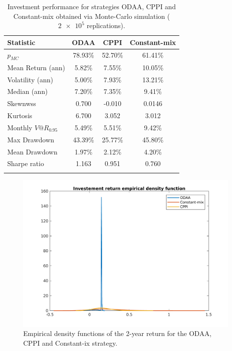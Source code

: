 \begin{table}[]
	\centering
	\begin{tabular}{@{}lccc@{}} \toprule
		Statistic & ODAA & CPPI & Constant-mix \\ \midrule
		$p_{MC}$ &  78.93\%    &  52.70\%    &  61.41\%    \\
		\addlinespace[0.5em]
		Mean Return (ann) & 5.82\%  & 7.55\% & 10.05\%\\
		\addlinespace[0.5em]
		Volatility (ann) & 5.00\%  & 7.93\% & 13.21\% \\
		\addlinespace[0.5em]
		Median (ann) &	7.20\% & 7.35\% & 9.41\% \\
		\addlinespace[0.5em]
		Skewnwss & 0.700 & -0.010 & 0.0146 \\
		\addlinespace[0.5em]
		Kurtosis & 6.700 & 3.052 & 3.012 \\
		\addlinespace[0.5em]
		Monthly $V@R_{0.95}$ & 5.49\% & 5.51\% & 9.42\%\\
		\addlinespace[0.5em]
		Max Drawdown & 43.39\% & 25.77\% & 45.80\% \\
		\addlinespace[0.5em]
		Mean Drawdown & 1.97\% & 2.12\% & 4.20\% \\
		\addlinespace[0.5em]
		Sharpe ratio & 1.163 & 0.951 & 0.760 \\ \bottomrule
		\addlinespace[0.5em]
	\end{tabular}
	\caption{Investment performance for strategies ODAA, CPPI and Constant-mix obtained via Monte-Carlo simulation ($\num{2e5}$ replications).}
	\label{tab:MC_statistics}
\end{table}



\begin{figure}[]
	\includegraphics[scale = 0.6]{Images/DensitiesMixturewk}
	\caption{Empirical density functions of the 2-year return for the ODAA, CPPI and Constant-ix strategy.}
	\label{fig:epirical_densities}
\end{figure}